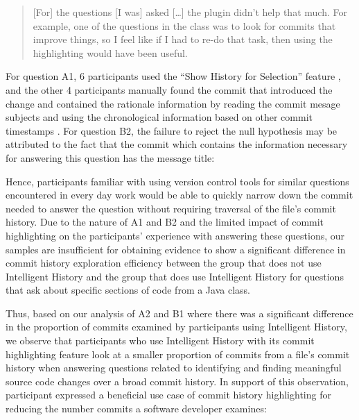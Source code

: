 \begin{quote}
  [For] the questions [I was] asked [\dots] the plugin didn’t help that much. 
  For example, one of the questions in the  class was to look for commits that improve things, 
  so I feel like if I had to re-do that task, then using the highlighting would have been useful.
\end{quote}

For question A1, 6 participants used the ``Show History for Selection'' feature ,
and the other 4 participants manually found the commit that introduced the change and contained the rationale information by reading the commit mesage subjects and using the chronological information based on other commit timestamps .
For question B2, the failure to reject the null hypothesis may be attributed to the fact that the commit  which contains the information necessary for answering this question has the message title: 

\begin{center}
\end{center}

Hence, participants familiar with using version control tools for similar questions encountered 
in every day work would be able to quickly narrow down the commit needed to answer 
the question without requiring traversal of the file's commit history.
Due to the nature of A1 and B2 and the limited impact of commit highlighting 
on the participants' experience with answering these questions,
our samples are insufficient for obtaining evidence to show a significant difference in 
commit history exploration efficiency between the group that does not use Intelligent History 
and the group that does use Intelligent History for questions that ask about specific sections of code from a Java class.

Thus, based on our analysis of A2 and B1 where there was a significant difference in 
the proportion of commits examined by participants using Intelligent History, 
we observe that participants who use Intelligent History with its commit highlighting feature 
look at a smaller proportion of commits from a file's commit history when answering questions related to
identifying and finding meaningful source code changes over a broad commit history.
In support of this observation, 
participant  expressed a beneficial use case of commit history highlighting 
for reducing the number commits a software developer examines:


